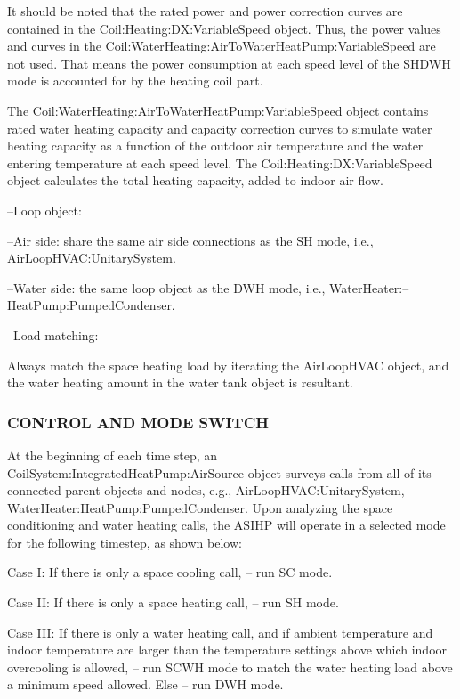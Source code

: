 It should be noted that the rated power and power correction curves are contained in the Coil:Heating:DX:VariableSpeed object. Thus, the power values and curves in the Coil:WaterHeating:AirToWaterHeatPump:VariableSpeed are not used. That means the power consumption at each speed level of the SHDWH mode is accounted for by the heating coil part. 

The Coil:WaterHeating:AirToWaterHeatPump:VariableSpeed object contains rated water heating capacity and capacity correction curves to simulate water heating capacity as a function of the outdoor air temperature and the water entering temperature at each speed level. The Coil:Heating:DX:VariableSpeed object calculates the total heating capacity, added to indoor air flow. 

--Loop object: 

--Air side: share the same air side connections as the SH mode, i.e., AirLoopHVAC:UnitarySystem.

--Water side: the same loop object as the DWH mode, i.e., WaterHeater:--HeatPump:PumpedCondenser.

--Load matching: 

Always match the space heating load by iterating the AirLoopHVAC object, and the water heating amount in the water tank object is resultant.

\subsubsection{CONTROL AND MODE SWITCH}\label{CONTROL-AND-MODE-SWITCH-ASIHP}

At the beginning of each time step, an CoilSystem:IntegratedHeatPump:AirSource object surveys calls from all of its connected parent objects and nodes, e.g.,  AirLoopHVAC:UnitarySystem, WaterHeater:HeatPump:PumpedCondenser. Upon analyzing the space conditioning and water heating calls, the ASIHP will operate in a selected mode for the following timestep, as shown below:

Case I: 
If there is only a space cooling call, – run SC mode.
 
Case II: 
If there is only a space heating call, – run SH mode.

Case III: 
If there is only a water heating call, and if ambient temperature and indoor temperature are larger than the temperature settings above which indoor overcooling is allowed, – run SCWH mode to match the water heating load above a minimum speed allowed.
Else – run DWH mode.

